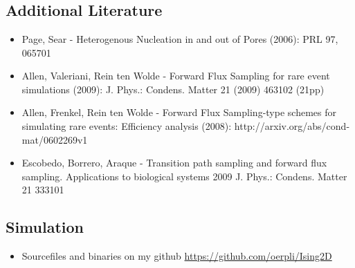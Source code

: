 \documentclass{beamer}
\begin{document}
\section{}
\subsection{Additional Literature}
\begin{frame}
\begin{itemize}
\item Page, Sear - Heterogenous Nucleation in and out of Pores (2006): PRL 97, 065701
\item Allen, Valeriani, Rein ten Wolde - Forward Flux Sampling for rare event simulations (2009): J. Phys.: Condens. Matter 21 (2009) 463102 (21pp)
\item Allen, Frenkel, Rein ten Wolde - Forward Flux Sampling-type schemes for simulating rare events: Efficiency analysis (2008): http://arxiv.org/abs/cond-mat/0602269v1
\item Escobedo, Borrero, Araque -  Transition path sampling and forward flux sampling. Applications to biological systems 2009 J. Phys.: Condens. Matter 21 333101
\end{itemize}
\end{frame}


\subsection{Simulation}
\begin{frame}
\begin{itemize}
\item Sourcefiles and binaries on my github \href{https://github.com/oerpli/Ising2D}{https://github.com/oerpli/Ising2D}
\end{itemize}
\end{frame}
\end{document}
